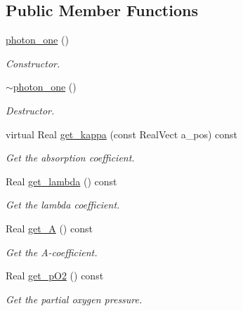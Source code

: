 \subsection*{Public Member Functions}
\begin{DoxyCompactItemize}
\item 
\hyperlink{classair__bolsig_1_1photon__one_afd637a5148dc1d76649075cdf3ca56b3}{photon\+\_\+one} ()
\begin{DoxyCompactList}\small\item\em Constructor. \end{DoxyCompactList}\item 
\hyperlink{classair__bolsig_1_1photon__one_a71c0c4c438bd5990d9661dce8c42a9ae}{$\sim$photon\+\_\+one} ()
\begin{DoxyCompactList}\small\item\em Destructor. \end{DoxyCompactList}\item 
virtual Real \hyperlink{classair__bolsig_1_1photon__one_a872183677e420c6a84176d510eeb47d1}{get\+\_\+kappa} (const Real\+Vect a\+\_\+pos) const 
\begin{DoxyCompactList}\small\item\em Get the absorption coefficient. \end{DoxyCompactList}\item 
Real \hyperlink{classair__bolsig_1_1photon__one_af9dd064dcdda3351e4d567e077a5a96c}{get\+\_\+lambda} () const 
\begin{DoxyCompactList}\small\item\em Get the lambda coefficient. \end{DoxyCompactList}\item 
Real \hyperlink{classair__bolsig_1_1photon__one_a06b8ecbff1a9c81edb457d71549cbb82}{get\+\_\+A} () const 
\begin{DoxyCompactList}\small\item\em Get the A-\/coefficient. \end{DoxyCompactList}\item 
Real \hyperlink{classair__bolsig_1_1photon__one_ae16295d3a631309419fc55a57ad78ed5}{get\+\_\+p\+O2} () const 
\begin{DoxyCompactList}\small\item\em Get the partial oxygen pressure. \end{DoxyCompactList}\end{DoxyCompactItemize}
